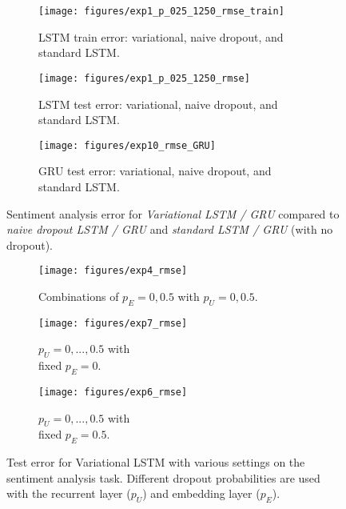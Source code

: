 \documentclass{article}
\theoremstyle{definition}
\begin{document}
\begin{figure*}[t!]
\captionsetup[subfigure]{justification=centering}
\begin{subfigure}[b]{0.32\linewidth}
\texttt{[image: figures/exp1\_p\_025\_1250\_rmse\_train]}

\caption{LSTM train error: variational, naive dropout, and standard LSTM.}
\label{fig:BLSTM-a}
\end{subfigure}
\begin{subfigure}[b]{0.32\linewidth}
\texttt{[image: figures/exp1\_p\_025\_1250\_rmse]}

\caption{LSTM test error: variational, naive dropout, and standard LSTM.}
\label{fig:BLSTM-b}
\end{subfigure}
\begin{subfigure}{0.32\linewidth}
\vspace{-38mm}
\texttt{[image: figures/exp10\_rmse\_GRU]}

\caption{GRU test error: variational, naive dropout, and standard LSTM.}
\label{fig:BGRU-a}
\end{subfigure}

\vspace{4mm}
\caption{
Sentiment analysis error for \textit{Variational LSTM / GRU} compared to \textit{naive dropout LSTM / GRU} and \textit{standard LSTM / GRU} (with no dropout).
}
\label{fig:BRNN}
\vspace{-4mm}
\end{figure*}



\begin{figure*}[b]
\captionsetup[subfigure]{justification=centering}
\begin{subfigure}{0.32\linewidth}
\texttt{[image: figures/exp4\_rmse]}

\caption{Combinations of $p_E=0, 0.5$ with $p_U=0, 0.5$.}
\label{fig:BRNN-combinations}
\end{subfigure}
\begin{subfigure}{0.32\linewidth}
\texttt{[image: figures/exp7\_rmse]}

\caption{$p_U=0, ..., 0.5$ with \\
fixed $p_E=0$.}
\label{fig:BRNN-funny1}
\end{subfigure}
\begin{subfigure}{0.32\linewidth}
\texttt{[image: figures/exp6\_rmse]}

\caption{$p_U=0, ..., 0.5$ with \\
fixed $p_E=0.5$.}
\label{fig:BRNN-funny3}
\end{subfigure}

\vspace{4mm}
\caption{Test error for Variational LSTM with various settings on the sentiment analysis task. Different dropout probabilities are used with the recurrent layer ($p_U$) and embedding layer ($p_E$).}
\vspace{2mm}
\end{figure*}
\end{document}
